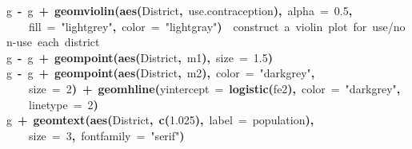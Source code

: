 \documentclass{article}
\makeatletter
\newcommand{\hlnumber}[1]{\textcolor[rgb]{0,0,0}{#1}}%
\newcommand{\hlfunctioncall}[1]{\textcolor[rgb]{.5,0,.33}{\textbf{#1}}}%
\newcommand{\hlstring}[1]{\textcolor[rgb]{.6,.6,1}{#1}}%
\newcommand{\hlkeyword}[1]{\textbf{#1}}%
\newcommand{\hlargument}[1]{\textcolor[rgb]{.69,.25,.02}{#1}}%
\newcommand{\hlcomment}[1]{\textcolor[rgb]{.18,.6,.34}{#1}}%
\newcommand{\hlassignement}[1]{\textbf{#1}}%
\newcommand{\hlsymbol}[1]{#1}%
\newcommand{\hlstd}[1]{\textcolor[rgb]{0,0,0}{#1}}%
\newenvironment{kframe}{%
 \def\FrameCommand##1{\hskip\@totalleftmargin \hskip-\fboxsep
 \colorbox{shadecolor}{##1}\hskip-\fboxsep
     \hskip-\linewidth \hskip-\@totalleftmargin \hskip\columnwidth}%
 \MakeFramed {\advance\hsize-\width
   \@totalleftmargin\z@ \linewidth\hsize
   \@setminipage}}%
 {\par\unskip\endMakeFramed}
\newenvironment{knitrout}{}{} %
\makeatother
\begin{document}
\begin{knitrout}
{\begin{kframe}
\begin{flushleft}
\hlstd{}\hlsymbol{g}{\ }\hlassignement{\usebox{\hlnormalsizeboxlessthan}-}{\ }\hlsymbol{g}{\ }\hlkeyword{+}{\ }\hlfunctioncall{geom\usebox{\hlnormalsizeboxunderscore}violin}\hlkeyword{(}\hlfunctioncall{aes}\hlkeyword{(}\hlsymbol{District}\hlkeyword{,}{\ }\hlsymbol{use.contraception}\hlkeyword{)}\hlkeyword{,}{\ }\hlargument{alpha}{\ }\hlargument{=}{\ }\hlnumber{0.5}\hlkeyword{,}\hspace*{\fill}\\
\hlstd{}{\ }{\ }{\ }{\ }\hlargument{fill}{\ }\hlargument{=}{\ }\hlstring{"{}lightgrey"{}}\hlkeyword{,}{\ }\hlargument{color}{\ }\hlargument{=}{\ }\hlstring{"{}lightgray"{}}\hlkeyword{)}{\ }{\ }\hlcomment{\usebox{\hlnormalsizeboxhash}\usebox{\hlnormalsizeboxhash}{\ }construct{\ }a{\ }violin{\ }plot{\ }for{\ }use/non-use{\ }each{\ }district}\hspace*{\fill}\\
\hlstd{}\hlsymbol{g}{\ }\hlassignement{\usebox{\hlnormalsizeboxlessthan}-}{\ }\hlsymbol{g}{\ }\hlkeyword{+}{\ }\hlfunctioncall{geom\usebox{\hlnormalsizeboxunderscore}point}\hlkeyword{(}\hlfunctioncall{aes}\hlkeyword{(}\hlsymbol{District}\hlkeyword{,}{\ }\hlsymbol{m1}\hlkeyword{)}\hlkeyword{,}{\ }\hlargument{size}{\ }\hlargument{=}{\ }\hlnumber{1.5}\hlkeyword{)}\hspace*{\fill}\\
\hlstd{}\hlsymbol{g}{\ }\hlassignement{\usebox{\hlnormalsizeboxlessthan}-}{\ }\hlsymbol{g}{\ }\hlkeyword{+}{\ }\hlfunctioncall{geom\usebox{\hlnormalsizeboxunderscore}point}\hlkeyword{(}\hlfunctioncall{aes}\hlkeyword{(}\hlsymbol{District}\hlkeyword{,}{\ }\hlsymbol{m2}\hlkeyword{)}\hlkeyword{,}{\ }\hlargument{color}{\ }\hlargument{=}{\ }\hlstring{"{}darkgrey"{}}\hlkeyword{,}\hspace*{\fill}\\
\hlstd{}{\ }{\ }{\ }{\ }\hlargument{size}{\ }\hlargument{=}{\ }\hlnumber{2}\hlkeyword{)}{\ }\hlkeyword{+}{\ }\hlfunctioncall{geom\usebox{\hlnormalsizeboxunderscore}hline}\hlkeyword{(}\hlargument{yintercept}{\ }\hlargument{=}{\ }\hlfunctioncall{logistic}\hlkeyword{(}\hlsymbol{fe2}\hlkeyword{)}\hlkeyword{,}{\ }\hlargument{color}{\ }\hlargument{=}{\ }\hlstring{"{}darkgrey"{}}\hlkeyword{,}\hspace*{\fill}\\
\hlstd{}{\ }{\ }{\ }{\ }\hlargument{linetype}{\ }\hlargument{=}{\ }\hlnumber{2}\hlkeyword{)}\hspace*{\fill}\\
\hlstd{}\hlsymbol{g}{\ }\hlkeyword{+}{\ }\hlfunctioncall{geom\usebox{\hlnormalsizeboxunderscore}text}\hlkeyword{(}\hlfunctioncall{aes}\hlkeyword{(}\hlsymbol{District}\hlkeyword{,}{\ }\hlfunctioncall{c}\hlkeyword{(}\hlnumber{1.025}\hlkeyword{)}\hlkeyword{,}{\ }\hlargument{label}{\ }\hlargument{=}{\ }\hlsymbol{population}\hlkeyword{)}\hlkeyword{,}\hspace*{\fill}\\
\hlstd{}{\ }{\ }{\ }{\ }\hlargument{size}{\ }\hlargument{=}{\ }\hlnumber{3}\hlkeyword{,}{\ }\hlargument{fontfamily}{\ }\hlargument{=}{\ }\hlstring{"{}serif"{}}\hlkeyword{)}\mbox{}
\normalfont
\end{flushleft}



\end{kframe}}
\end{knitrout}
\end{document}
